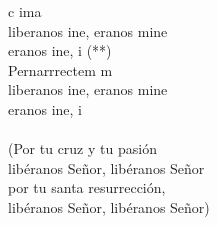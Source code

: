 \begin{cancion}%
	 c  ima\\
	liberanos ine, eranos mine\\
	eranos ine, i (**)\\
	Pernarrrectem m\\
	liberanos ine, eranos mine\\
	eranos ine, i\\
	\jump\\
(Por tu cruz y tu pasión\\
 libéranos Señor, libéranos Señor\\
 por tu santa resurrección,\\
 libéranos Señor, libéranos Señor)\\
\end{cancion}%
